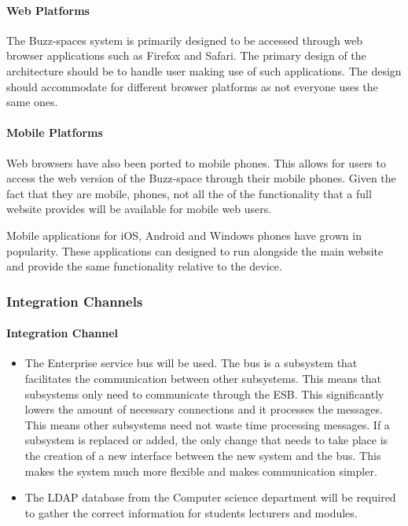 \documentclass[10pt]{article}
\begin{document}
\paragraph{Web Platforms}
The Buzz-spaces system is primarily designed to be accessed through web browser applications such as Firefox and Safari. The primary design of the architecture should be to handle user making use of such applications. The design should accommodate for different browser platforms as not everyone uses the same ones.


\paragraph{Mobile Platforms}
Web browsers have also been ported to mobile phones. This allows for users to access the web version of the Buzz-space through their mobile phones. Given the fact that they are mobile, phones, not all the of the functionality that a full website provides will be available for mobile web users.

Mobile applications for iOS, Android and Windows phones have grown in popularity. These applications can designed to run alongside the main website and provide the same functionality relative to the device. 


\subsubsection{Integration Channels}
\paragraph{Integration Channel}
\begin{itemize}
\item \hfill The Enterprise service bus will be used. The bus is a subsystem that facilitates the communication between other subsystems. This means that subsystems only need to communicate through the ESB. This significantly lowers the amount of necessary connections and it processes the messages. This means other subsystems need not waste time processing messages. If a subsystem is replaced or added, the only change that needs to take place is the creation of a new interface between the new system and the bus. This makes the system much more flexible and makes communication simpler. %
\item \hfill The LDAP database from the Computer science department will be required to gather the correct information for students lecturers and modules.
\end{itemize}
\end{document}
